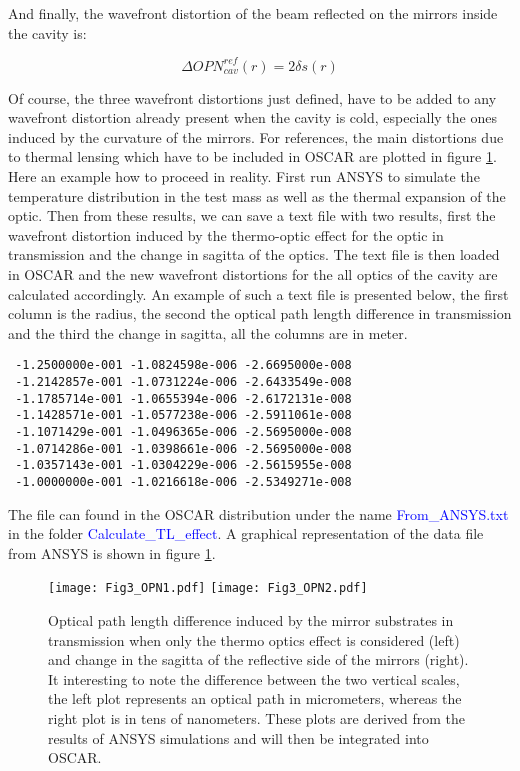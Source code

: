 And finally, the wavefront distortion of the beam reflected on the mirrors inside the cavity is:

\begin{equation}\label{eq3:OPN3}
  \Delta OPN_{cav}^{ref}(r) = 2 \delta s(r)
\end{equation}

Of course, the three wavefront distortions just defined, have to be added to any wavefront distortion already present when the cavity is cold, especially the ones induced by the curvature of the mirrors. For references, the main distortions due to thermal lensing which have to be included in OSCAR are plotted in figure \ref{fig3:OPN}.\\

Here an example how to proceed in reality. First run ANSYS to simulate the temperature distribution in the test mass as well as the thermal expansion of the optic. Then from these results, we can save a text file with two results, first the wavefront distortion induced by the thermo-optic effect for the optic in transmission and the change in sagitta of the optics. The text file is then loaded in OSCAR and the new wavefront distortions for the all optics of the cavity are calculated accordingly. An example of such a text file is presented below, the first column is the radius, the second the optical path length difference in transmission and the third the change in sagitta, all the columns are in meter.

\begin{verbatim}
 -1.2500000e-001 -1.0824598e-006 -2.6695000e-008
 -1.2142857e-001 -1.0731224e-006 -2.6433549e-008
 -1.1785714e-001 -1.0655394e-006 -2.6172131e-008
 -1.1428571e-001 -1.0577238e-006 -2.5911061e-008
 -1.1071429e-001 -1.0496365e-006 -2.5695000e-008
 -1.0714286e-001 -1.0398661e-006 -2.5695000e-008
 -1.0357143e-001 -1.0304229e-006 -2.5615955e-008
 -1.0000000e-001 -1.0216618e-006 -2.5349271e-008
\end{verbatim}

The file can found in the OSCAR distribution under the name \textcolor{blue}{From\_ANSYS.txt} in the folder \textcolor{blue}{Calculate\_TL\_effect}. A graphical representation of the data file from ANSYS is shown in figure \ref{fig3:OPN}.


\begin{figure}
\begin{center}
\texttt{[image: Fig3\_OPN1.pdf]}\hfill
\texttt{[image: Fig3\_OPN2.pdf]}
\end{center}
\caption{\label{fig3:OPN} Optical path length difference induced by the mirror substrates in transmission when only the thermo optics effect is considered (left) and change in the sagitta of the reflective side of the mirrors (right). It interesting to note the difference between the two vertical scales, the left plot represents an optical path in micrometers, whereas the right plot is in tens of nanometers. These plots are derived from the results of ANSYS simulations and will then be integrated into OSCAR.}
\end{figure}

